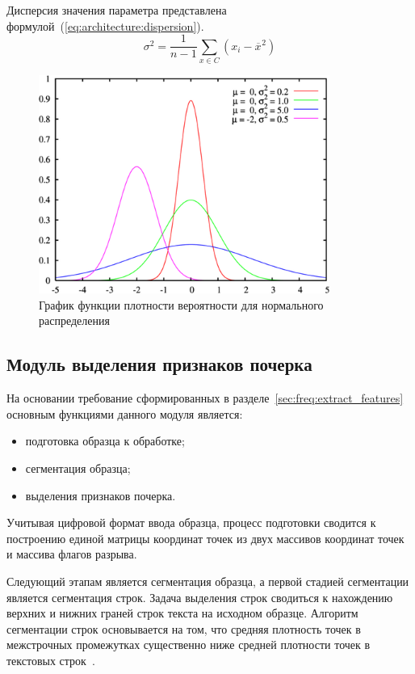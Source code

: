 Дисперсия значения параметра представлена формулой~(\ref{eq:architecture:dispersion}).
\begin{equation}
  \label{eq:architecture:dispersion}
  \sigma_{}^2 = \frac{1}{n - 1} \sum\limits_{x \in C} (x_i - \overline{x_{}}^2)
\end{equation}

\begin{figure}[!h]
    \centering
    \includegraphics[width=0.85\textwidth]{figures/gauss.png}
    \caption{График функции плотности вероятности для нормального распределения}
    \label{fig:architecture:normal_pd}
\end{figure}

\subsection{Модуль выделения признаков почерка}
На основании требование сформированных в разделе~\ref{sec:freq:extract_features} основным функциями данного модуля является:
\begin{itemize}
  \item подготовка образца к обработке;
  \item сегментация образца;
  \item выделения признаков почерка.
\end{itemize}

Учитывая цифровой формат ввода образца, процесс подготовки сводится к построению единой матрицы координат точек из двух массивов координат точек и массива флагов разрыва.

Следующий этапам является сегментация образца, а первой стадией сегментации является сегментация строк.
Задача выделения строк сводиться к нахождению верхних и нижних граней строк текста на исходном образце. Алгоритм сегментации строк основывается на том, что средняя плотность точек в межстрочных промежутках существенно ниже средней плотности точек в текстовых строк~\cite{cv_text_image_segmentator}.

